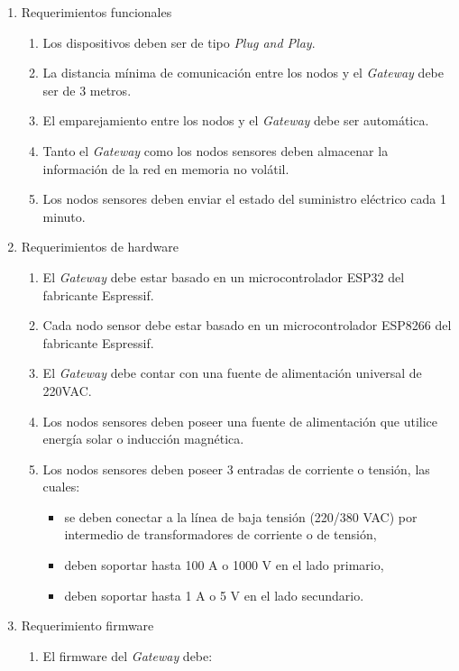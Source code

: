 \documentclass[
11pt, %
]{charter}
\begin{document}
\begin{enumerate}
	\item Requerimientos funcionales
		\begin{enumerate}
			\item Los dispositivos deben ser de tipo \textit{Plug and Play}.
			\item La distancia mínima de comunicación entre los nodos y el \textit{Gateway} debe ser de 3 metros.
			\item El emparejamiento entre los nodos y el \textit{Gateway} debe ser automática.
			\item Tanto el \textit{Gateway} como los nodos sensores deben almacenar la información de la red en memoria no volátil.
			\item Los nodos sensores deben enviar el estado del suministro eléctrico cada 1 minuto.
		\end{enumerate}
	\item Requerimientos de hardware
		\begin{enumerate}
			\item El \textit{Gateway} debe estar basado en un microcontrolador ESP32 del fabricante Espressif.
			\item Cada nodo sensor debe estar basado en un microcontrolador ESP8266 del fabricante Espressif.
			\item El \textit{Gateway} debe contar con una fuente de alimentación universal de 220VAC.
			\item Los nodos sensores deben poseer una fuente de alimentación que utilice energía solar o inducción magnética.
			\item Los nodos sensores deben poseer 3 entradas de corriente o tensión, las cuales:
				\begin{itemize}
					\item se deben conectar a la línea de baja tensión (220/380 VAC) por intermedio de transformadores de corriente o de tensión,
					\item deben soportar hasta 100 A o 1000 V en el lado primario,
					\item deben soportar hasta 1 A o 5 V en el lado secundario.
				\end{itemize}						
		\end{enumerate}
	\item Requerimiento firmware
		\begin{enumerate}
			\item El firmware del \textit{Gateway} debe:
				\begin{itemize}

\end{itemize}
\end{enumerate}
\end{enumerate}
\end{document}
